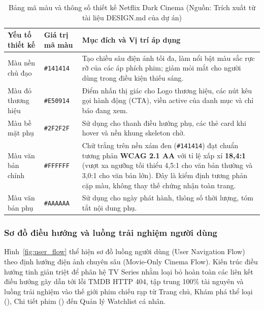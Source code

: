 \documentclass[12pt,a4paper]{extarticle}
\begin{document}
\begin{table}[H]
\centering
\caption{Bảng mã màu và thông số thiết kế Netflix Dark Cinema (Nguồn: Trích xuất từ tài liệu DESIGN.md của dự án)}
\label{tab:design_tokens}
\begin{tabularx}{\textwidth}{>{\raggedright\arraybackslash}p{3.0cm}>{\raggedright\arraybackslash}p{2.5cm}>{\raggedright\arraybackslash}X}
\toprule
\textbf{Yếu tố thiết kế} & \textbf{Giá trị mã màu} & \textbf{Mục đích và Vị trí áp dụng} \\
\midrule
Màu nền chủ đạo & \texttt{\#141414} & Tạo chiều sâu điện ảnh tối đa, làm nổi bật màu sắc rực rỡ của các áp phích phim; giảm mỏi mắt cho người dùng trong điều kiện thiếu sáng. \\
Màu đỏ thương hiệu & \texttt{\#E50914} & Điểm nhấn thị giác cho Logo thương hiệu, các nút kêu gọi hành động (CTA), viền active của danh mục và chỉ báo đang xem. \\
Màu bề mặt phụ & \texttt{\#2F2F2F} & Sử dụng cho thanh điều hướng phụ, các thẻ card khi hover và nền khung skeleton chờ. \\
Màu văn bản chính & \texttt{\#FFFFFF} & Chữ trắng trên nền xám đen (\texttt{\#141414}) đạt chuẩn tương phản \textbf{WCAG 2.1 AA} với tỉ lệ xấp xỉ \textbf{18,4:1} (vượt xa ngưỡng tối thiểu 4,5:1 cho văn bản thường và 3,0:1 cho văn bản lớn). Đây là kiểm định tương phản cặp màu, không thay thế chứng nhận toàn trang. \\
Màu văn bản phụ & \texttt{\#AAAAAA} & Sử dụng cho ngày phát hành, thông số thời lượng, tóm tắt nội dung phụ. \\
\bottomrule
\end{tabularx}
\end{table}

\subsubsection{Sơ đồ điều hướng và luồng trải nghiệm người dùng}
Hình~\ref{fig:user_flow} thể hiện sơ đồ luồng người dùng (User Navigation Flow) theo định hướng điện ảnh chuyên sâu (Movie-Only Cinema Flow). Kiến trúc điều hướng tinh giản triệt để phân hệ TV Series nhằm loại bỏ hoàn toàn các liên kết điều hướng gãy dẫn tới lỗi TMDB HTTP 404, tập trung 100\% tài nguyên và luồng trải nghiệm vào thế giới phim chiếu rạp từ Trang chủ, Khám phá thể loại (), Chi tiết phim () đến Quản lý Watchlist cá nhân.
\end{document}
